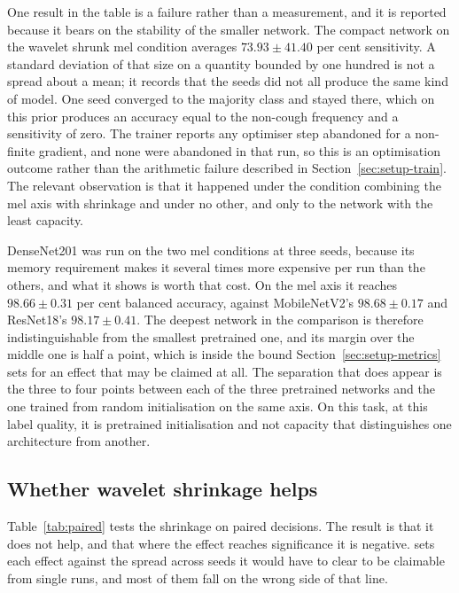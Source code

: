 One result in the table is a failure rather than a measurement, and it is reported because
it bears on the stability of the smaller network. The compact network on the wavelet
shrunk mel condition averages $73.93 \pm 41.40$ per cent sensitivity. A standard deviation
of that size on a quantity bounded by one hundred is not a spread about a mean; it records
that the seeds did not all produce the same kind of model. One seed converged to the
majority class and stayed there, which on this prior produces an accuracy equal to the
non-cough frequency and a sensitivity of zero. The trainer reports any optimiser step
abandoned for a non-finite gradient, and none were abandoned in that run, so this is an
optimisation outcome rather than the arithmetic failure described in
Section~\ref{sec:setup-train}. The relevant observation is that it happened under the
condition combining the mel axis with shrinkage and under no other, and only to the
network with the least capacity.

DenseNet201 was run on the two mel conditions at three seeds, because its memory
requirement makes it several times more expensive per run than the others, and what it
shows is worth that cost. On the mel axis it reaches $98.66 \pm 0.31$ per cent balanced
accuracy, against MobileNetV2's $98.68 \pm 0.17$ and ResNet18's $98.17 \pm 0.41$. The
deepest network in the comparison is therefore indistinguishable from the smallest
pretrained one, and its margin over the middle one is half a point, which is inside the
bound Section~\ref{sec:setup-metrics} sets for an effect that may be claimed at all. The
separation that does appear is the three to four points between each of the three
pretrained networks and the one trained from random initialisation on the same axis. On
this task, at this label quality, it is pretrained initialisation and not capacity that
distinguishes one architecture from another.

\subsection{Whether wavelet shrinkage helps}\label{sec:res-denoise}

Table~\ref{tab:paired} tests the shrinkage on paired decisions. The result is that it does
not help, and that where the effect reaches significance it is negative.  sets each effect against the spread across seeds it would have to clear to be claimable from single runs, and most of them fall on the wrong side of that line.

